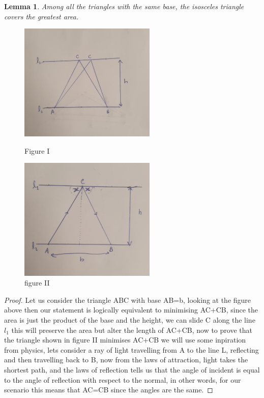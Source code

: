 \documentclass[a4paper]{book}
\newtheorem{lemma}[theorem]{Lemma}%
\begin{document}
\begin{lemma} 
    Among all the triangles with the same base, the isosceles triangle covers the greatest area.
\end{lemma}
\begin{figure}[h]
    \centering
    \begin{minipage}{0.5\textwidth}
        \centering
        \includegraphics[width=65mm]{isofig5.png} %
        \caption{Figure I}
    \end{minipage}\hfill
    \begin{minipage}{0.5\textwidth}
        \centering
        \includegraphics[width=65mm]{isofig6.png} %
        \caption{figure II}
    \end{minipage}
\end{figure}
\begin{proof} 
    Let us consider the triangle ABC with base AB=b, looking at the figure above then our statement is logically equivalent to minimising AC+CB, since the area is just the product of the base and the height, we can slide C along the line $l_1$ this will preserve the area but alter the length of AC+CB, now to prove that the triangle shown in figure II minimises AC+CB we will use some inpiration from physics, lets consider a ray of light travelling from A to the line L, reflecting and then travelling back to B, now from the laws of attraction, light takes the shortest path, and the laws of reflection tells us that the angle of incident is equal to the angle of reflection with respect to the normal, in other words, for our scenario this means that AC=CB since the angles are the same. 
\end{proof}
\end{document}
